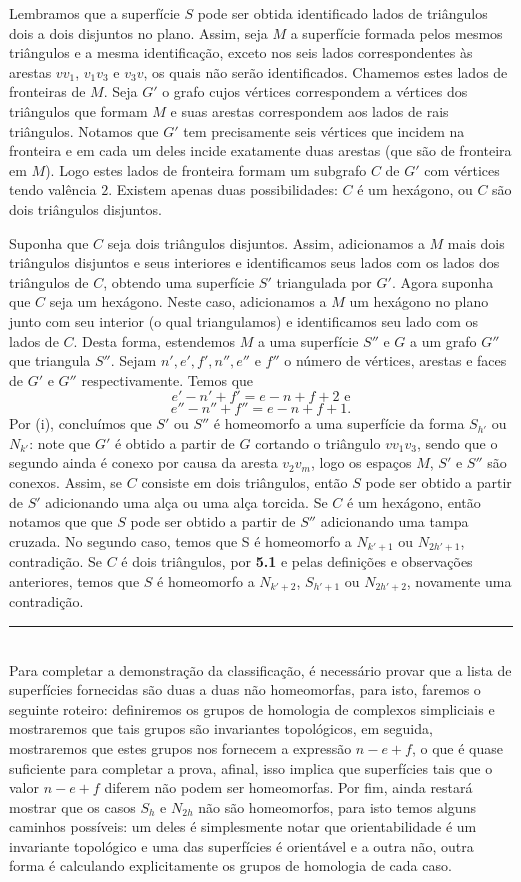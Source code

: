 \documentclass[12pt,a4paper]{article}
\def\eop{\hfill\rule{2.5mm}{2.5mm} \\ }
\theoremstyle{definition}
\begin{document}
Lembramos que a superfície $S$ pode ser obtida identificado lados de triângulos dois a dois disjuntos no plano. Assim, seja $M$ a superfície formada pelos mesmos triângulos e a mesma identificação, exceto nos seis lados correspondentes às arestas $vv_1$, $v_1v_3$ e $v_3v$, os quais não serão identificados. Chamemos estes lados de fronteiras de $M$. Seja $G'$ o grafo cujos vértices correspondem a vértices dos triângulos que formam $M$ e suas arestas correspondem aos lados de rais triângulos. Notamos que $G'$ tem precisamente seis vértices que incidem na fronteira e em cada um deles incide exatamente duas arestas (que são de fronteira em $M$). Logo estes lados de fronteira formam um subgrafo $C$ de $G'$ com vértices tendo valência $2$. Existem apenas duas possibilidades: $C$ é um hexágono, ou $C$ são dois triângulos disjuntos.

Suponha que $C$ seja dois triângulos disjuntos. Assim, adicionamos a $M$ mais dois triângulos disjuntos e seus interiores e identificamos seus lados com os lados dos triângulos de $C$, obtendo uma superfície $S'$ triangulada por $G'$. Agora suponha que $C$ seja um hexágono. Neste caso, adicionamos a $M$ um hexágono no plano junto com seu interior (o qual triangulamos) e identificamos seu lado com os lados de $C$. Desta forma, estendemos $M$ a uma superfície $S''$ e $G$ a um grafo $G''$ que triangula $S''$. Sejam $n',e',f',n'',e''$ e $f''$ o número de vértices, arestas e faces de $G'$ e $G''$ respectivamente. Temos que $$e'-n'+f' = e-n+f+2 \text{    e}$$ $$e''-n''+f'' = e-n+f+1.$$ Por (i), concluímos que $S'$ ou $S''$ é homeomorfo a uma superfície da forma $S_{h'}$ ou $N_{k'}$: note que $G'$ é obtido a partir de $G$ cortando o triângulo $vv_1v_3$, sendo que o segundo ainda é conexo por causa da aresta $v_2v_m$, logo os espaços $M$, $S'$ e $S''$ são conexos. Assim, se $C$ consiste em dois triângulos, então $S$ pode ser obtido a partir de $S'$ adicionando uma alça ou uma alça torcida. Se $C$ é um hexágono, então notamos que que $S$ pode ser obtido a partir de $S''$ adicionando uma tampa cruzada. No segundo caso, temos que S é homeomorfo a $N_{k'+1}$ ou $N_{2h'+1}$, contradição. Se $C$ é dois triângulos, por \textbf{5.1} e pelas definições e observações anteriores, temos que $S$ é homeomorfo a $N_{k'+2}$, $S_{h'+1}$ ou $N_{2h'+2}$, novamente uma contradição. \eop  

Para completar a demonstração da classificação, é necessário provar que a lista de superfícies fornecidas são duas a duas não homeomorfas, para isto, faremos o seguinte roteiro: definiremos os grupos de homologia de complexos simpliciais e mostraremos que tais grupos são invariantes topológicos, em seguida, mostraremos que estes grupos nos fornecem a expressão $n-e+f$, o que é quase suficiente para completar a prova, afinal, isso implica que superfícies tais que o valor $n-e+f$ diferem não podem ser homeomorfas. Por fim, ainda restará mostrar que os casos $S_{h}$ e $N_{2h}$ não são homeomorfos, para isto temos alguns caminhos possíveis: um deles é simplesmente notar que orientabilidade é um invariante topológico e uma das superfícies é orientável e a outra não, outra forma é calculando explicitamente os grupos de homologia de cada caso. 
\end{document}
